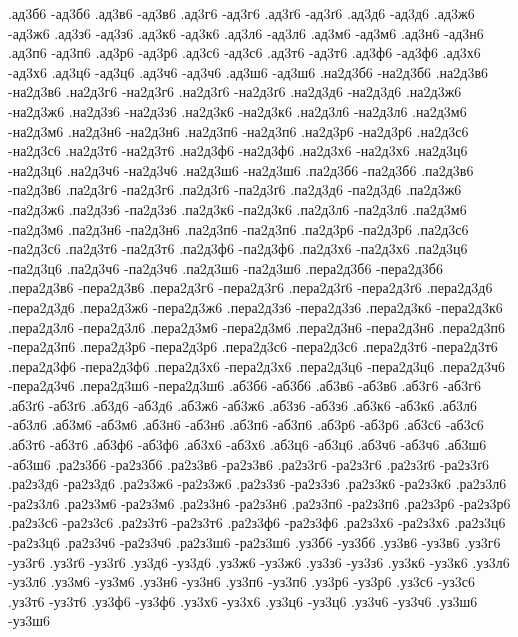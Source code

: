 {%
%
%
.ад3б6 -ад3б6
.ад3в6 -ад3в6
.ад3г6 -ад3г6
.ад3ґ6 -ад3ґ6
.ад3д6 -ад3д6
.ад3ж6 -ад3ж6
.ад3з6 -ад3з6
.ад3к6 -ад3к6
.ад3л6 -ад3л6
.ад3м6 -ад3м6
.ад3н6 -ад3н6
.ад3п6 -ад3п6
.ад3р6 -ад3р6
.ад3с6 -ад3с6
.ад3т6 -ад3т6
.ад3ф6 -ад3ф6
.ад3х6 -ад3х6
.ад3ц6 -ад3ц6
.ад3ч6 -ад3ч6
.ад3ш6 -ад3ш6
.на2д3б6 -на2д3б6
.на2д3в6 -на2д3в6
.на2д3г6 -на2д3г6
.на2д3ґ6 -на2д3ґ6
.на2д3д6 -на2д3д6
.на2д3ж6 -на2д3ж6
.на2д3з6 -на2д3з6
.на2д3к6 -на2д3к6
.на2д3л6 -на2д3л6
.на2д3м6 -на2д3м6
.на2д3н6 -на2д3н6
.на2д3п6 -на2д3п6
.на2д3р6 -на2д3р6
.на2д3с6 -на2д3с6
.на2д3т6 -на2д3т6
.на2д3ф6 -на2д3ф6
.на2д3х6 -на2д3х6
.на2д3ц6 -на2д3ц6
.на2д3ч6 -на2д3ч6
.на2д3ш6 -на2д3ш6
.па2д3б6 -па2д3б6
.па2д3в6 -па2д3в6
.па2д3г6 -па2д3г6
.па2д3ґ6 -па2д3ґ6
.па2д3д6 -па2д3д6
.па2д3ж6 -па2д3ж6
.па2д3з6 -па2д3з6
.па2д3к6 -па2д3к6
.па2д3л6 -па2д3л6
.па2д3м6 -па2д3м6
.па2д3н6 -па2д3н6
.па2д3п6 -па2д3п6
.па2д3р6 -па2д3р6
.па2д3с6 -па2д3с6
.па2д3т6 -па2д3т6
.па2д3ф6 -па2д3ф6
.па2д3х6 -па2д3х6
.па2д3ц6 -па2д3ц6
.па2д3ч6 -па2д3ч6
.па2д3ш6 -па2д3ш6
.пера2д3б6 -пера2д3б6
.пера2д3в6 -пера2д3в6
.пера2д3г6 -пера2д3г6
.пера2д3ґ6 -пера2д3ґ6
.пера2д3д6 -пера2д3д6
.пера2д3ж6 -пера2д3ж6
.пера2д3з6 -пера2д3з6
.пера2д3к6 -пера2д3к6
.пера2д3л6 -пера2д3л6
.пера2д3м6 -пера2д3м6
.пера2д3н6 -пера2д3н6
.пера2д3п6 -пера2д3п6
.пера2д3р6 -пера2д3р6
.пера2д3с6 -пера2д3с6
.пера2д3т6 -пера2д3т6
.пера2д3ф6 -пера2д3ф6
.пера2д3х6 -пера2д3х6
.пера2д3ц6 -пера2д3ц6
.пера2д3ч6 -пера2д3ч6
.пера2д3ш6 -пера2д3ш6
.аб3б6 -аб3б6
.аб3в6 -аб3в6
.аб3г6 -аб3г6
.аб3ґ6 -аб3ґ6
.аб3д6 -аб3д6
.аб3ж6 -аб3ж6
.аб3з6 -аб3з6
.аб3к6 -аб3к6
.аб3л6 -аб3л6
.аб3м6 -аб3м6
.аб3н6 -аб3н6
.аб3п6 -аб3п6
.аб3р6 -аб3р6
.аб3с6 -аб3с6
.аб3т6 -аб3т6
.аб3ф6 -аб3ф6
.аб3х6 -аб3х6
.аб3ц6 -аб3ц6
.аб3ч6 -аб3ч6
.аб3ш6 -аб3ш6
.ра2з3б6 -ра2з3б6
.ра2з3в6 -ра2з3в6
.ра2з3г6 -ра2з3г6
.ра2з3ґ6 -ра2з3ґ6
.ра2з3д6 -ра2з3д6
.ра2з3ж6 -ра2з3ж6
.ра2з3з6 -ра2з3з6
.ра2з3к6 -ра2з3к6
.ра2з3л6 -ра2з3л6
.ра2з3м6 -ра2з3м6
.ра2з3н6 -ра2з3н6
.ра2з3п6 -ра2з3п6
.ра2з3р6 -ра2з3р6
.ра2з3с6 -ра2з3с6
.ра2з3т6 -ра2з3т6
.ра2з3ф6 -ра2з3ф6
.ра2з3х6 -ра2з3х6
.ра2з3ц6 -ра2з3ц6
.ра2з3ч6 -ра2з3ч6
.ра2з3ш6 -ра2з3ш6
.уз3б6 -уз3б6
.уз3в6 -уз3в6
.уз3г6 -уз3г6
.уз3ґ6 -уз3ґ6
.уз3д6 -уз3д6
.уз3ж6 -уз3ж6
.уз3з6 -уз3з6
.уз3к6 -уз3к6
.уз3л6 -уз3л6
.уз3м6 -уз3м6
.уз3н6 -уз3н6
.уз3п6 -уз3п6
.уз3р6 -уз3р6
.уз3с6 -уз3с6
.уз3т6 -уз3т6
.уз3ф6 -уз3ф6
.уз3х6 -уз3х6
.уз3ц6 -уз3ц6
.уз3ч6 -уз3ч6
.уз3ш6 -уз3ш6
}
